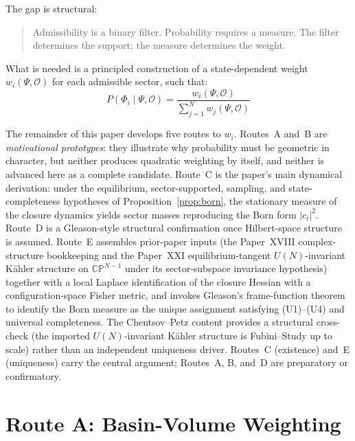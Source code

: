 \documentclass[12pt]{article}
\newcommand{\Ocal}{\mathcal{O}}
\begin{document}
The gap is structural:

\begin{quote}
Admissibility is a binary filter. Probability requires a measure. The filter determines the support; the measure determines the weight.
\end{quote}

What is needed is a principled construction of a state-dependent weight $w_i(\Psi, \Ocal)$ for each admissible sector, such that:
\begin{equation}\label{eq:weight}
    P(\Phi_i \mid \Psi, \Ocal) = \frac{w_i(\Psi, \Ocal)}{\sum_{j=1}^N w_j(\Psi, \Ocal)}
\end{equation}

The remainder of this paper develops five routes to $w_i$. Routes~A and~B are \emph{motivational prototypes}: they illustrate why probability must be geometric in character, but neither produces quadratic weighting by itself, and neither is advanced here as a complete candidate. Route~C is the paper's main dynamical derivation: under the equilibrium, sector-supported, sampling, and state-completeness hypotheses of Proposition~\ref{prop:born}, the stationary measure of the closure dynamics yields sector masses reproducing the Born form $|c_i|^2$. Route~D is a Gleason-style structural confirmation once Hilbert-space structure is assumed. Route~E assembles prior-paper inputs (the Paper~XVIII complex-structure bookkeeping and the Paper~XXI equilibrium-tangent $U(N)$-invariant K\"ahler structure on $\mathbb{CP}^{N-1}$ under its sector-subspace invariance hypothesis) together with a local Laplace identification of the closure Hessian with a configuration-space Fisher metric, and invokes Gleason's frame-function theorem to identify the Born measure as the unique assignment satisfying (U1)--(U4) and universal completeness. The Chentsov--Petz content provides a structural cross-check (the imported $U(N)$-invariant K\"ahler structure is Fubini--Study up to scale) rather than an independent uniqueness driver. Routes~C (existence) and~E (uniqueness) carry the central argument; Routes~A, B, and~D are preparatory or confirmatory.

\section{Route A: Basin-Volume Weighting}\label{sec:basin}
\end{document}
